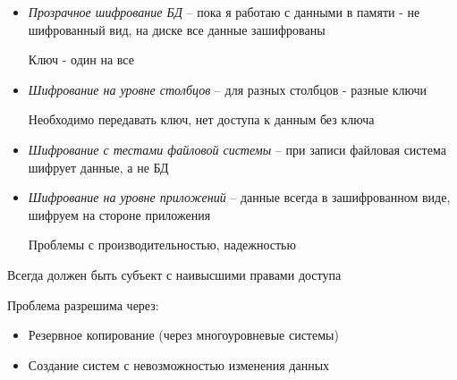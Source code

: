 \documentclass[12pt, a4paper]{article}
\begin{document}
\begin{itemize}
    \item \emph{Прозрачное шифрование БД} -- пока я работаю с данными в памяти - не шифрованный вид, на диске все данные зашифрованы
    
    Ключ - один на все
    
    \item \emph{Шифрование на уровне столбцов} -- для разных столбцов - разные ключи
    
    Необходимо передавать ключ, нет доступа к данным без ключа
    
    \item \emph{Шифрование с тестами файловой системы} -- при записи файловая система шифрует данные, а не БД
    
    \item \emph{Шифрование на уровне приложений} -- данные всегда в зашифрованном виде, шифруем на стороне приложения
    
    Проблемы с производительностью, надежностью
    
\end{itemize}

Всегда должен быть субъект с наивысшими правами доступа

Проблема разрешима через: 
\begin{itemize}
    \item Резервное копирование (через многоуровневые системы)
    \item Создание систем с невозможностью изменения данных
\end{itemize}
\end{document}
